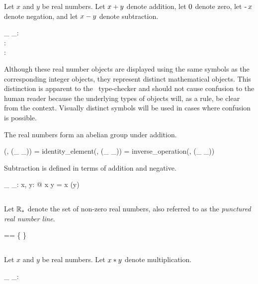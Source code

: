 \documentclass{amsart}
\begin{document}
Let $x$ and $y$ be real numbers.
Let $x \mathbin{+} y$ denote addition,
let $0$ denote zero,
let $\operatorname{-} x$ denote negation,
and let $x \mathbin{-} y$ denote subtraction.

\begin{axdef}
	\_ \addR \_: \R \cross \R \fun \R \\
	\zeroR: \R \\
	\negR: \R \fun \R
\end{axdef}

Although these real number objects are displayed using the same symbols as the corresponding integer objects,
they represent distinct mathematical objects.
This distinction is apparent to the \fuzz\ type-checker and should not cause confusion to the human reader
because the underlying types of objects will, as a rule, be clear from the context.
Visually distinct symbols will be used in cases where confusion is possible.

The real numbers form an abelian group under addition.

\begin{zed}
(\R, (\_ \addR \_)) \in \abgroup \R
\also
\zeroR = identity\_element(\R, (\_ \addR \_))
\also
\negR = inverse\_operation(\R, (\_ \addR \_))
\end{zed}

Subtraction is defined in terms of addition and negative.

\begin{axdef}
	\_ \subR \_: \R \cross \R \fun \R
	\where
	\forall x, y: \R @ x \subR y = x \addR (\negR y)
\end{axdef}

\subsection{}

Let $\mathbb{R}_{*}$ denote the set of non-zero real numbers,
also referred to as the {\it punctured real number line}.

\begin{zed}
	\Rnz == \R \setminus \{ \zeroR \}
\end{zed}

\subsection{}

Let $x$ and $y$ be real numbers.
Let $x \mathbin{*} y$ denote multiplication.

\begin{axdef}
	\_ \mulR \_: \R \cross \R \fun \R
\end{axdef}
\end{document}
